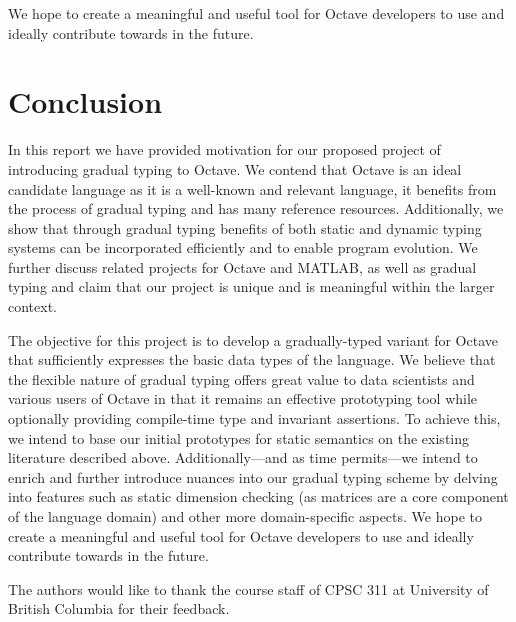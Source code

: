 We hope to create a meaningful and useful tool for Octave developers to use and ideally contribute towards in the future.

\section{Conclusion}
In this report we have provided motivation for our proposed project of introducing gradual typing to Octave. We contend that Octave is an ideal candidate language as it is a well-known and relevant language, it benefits from the process of gradual typing and has many reference resources. Additionally, we show that through gradual typing benefits of both static and dynamic typing systems can be incorporated efficiently and to enable program evolution. We further discuss related projects for Octave and MATLAB, as well as gradual typing and claim that our project is unique and is meaningful within the larger context.
 
The objective for this project is to develop a gradually-typed variant for Octave that sufficiently expresses the basic data types of the language. We believe that the flexible nature of gradual typing offers great value to data scientists and various users of Octave in that it remains an effective prototyping tool while optionally providing compile-time type and invariant assertions. To achieve this, we intend to base our initial prototypes for static semantics on the existing literature described above. Additionally---and as time permits---we intend to enrich and further introduce nuances into our gradual typing scheme by delving into features such as static dimension checking (as matrices are a core component of the language domain) and other more domain-specific aspects. We hope to create a meaningful and useful tool for Octave developers to use and ideally contribute towards in the future.


\appendix

\begin{acks}
    The authors would like to thank the course staff of CPSC 311 at University
    of British Columbia for their feedback.
\end{acks}
